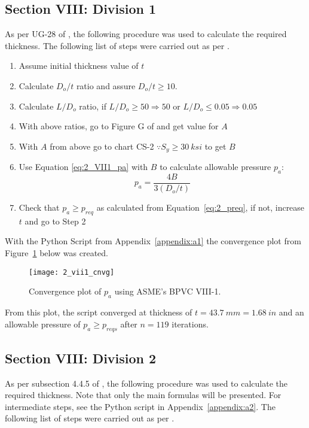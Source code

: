 \subsection{Section VIII: Division 1}
As per UG-28 of \cite{ASMEbvpcVII1}, the following procedure was used to calculate the required thickness.
The following list of steps were carried out as per \cite{ASMEbvpcVII1}.

\begin{enumerate}
	\item Assume initial thickness value of $t$
	\item Calculate $D_o/t$ ratio and assure $D_o/t \geq 10$.
	\item Calculate $L/D_o$ ratio, if $L/D_o \geq 50 \Rightarrow 50$ or  $L/D_o \leq 0.05 \Rightarrow 0.05$
	\item With above ratios, go to Figure G of \cite{ASMEbvpcIID} and get value for $A$
	\item With $A$ from above go to chart CS-2 $\because S_y \geq 30 \ ksi$ to get $B$
	\item Use Equation \ref{eq:2_VII1_pa} with $B$ to calculate allowable pressure $p_a$:
	      \begin{equation}
	      	\label{eq:2_VII1_pa}
	      	p_a = \frac{4B}{3 \left(D_o/t\right)}
	      \end{equation}
	\item Check that $p_a \geq p_{req}$ as calculated from Equation~\ref{eq:2_preq}, if not, increase $t$ and go to Step 2\\
	      	
\end{enumerate}

With the Python Script from Appendix~\ref{appendix:a1} the convergence plot from Figure~\ref{fig:2_vii1_cnvg} below was created.
\begin{figure}[H]
	\centering
	\texttt{[image: 2\_vii1\_cnvg]}
	\caption{Convergence plot of $p_a$ using ASME's BPVC VIII-1.}
	\label{fig:2_vii1_cnvg}
\end{figure}

From this plot, the script converged at thickness of $t = 43.7\ mm = 1.68\ in$ and an allowable pressure of $p_a\geq p_{reqs}$ after $n=119$ iterations. 


\subsection{Section VIII: Division 2}
As per subsection 4.4.5 of \cite{ASMEbvpcVII2}, the following procedure was used to calculate the required thickness. Note that only the main formulas will be presented. For intermediate steps, see  the Python script in Appendix~\ref{appendix:a2}. The following list of steps were carried out as per \cite{ASMEbvpcVII2}.

